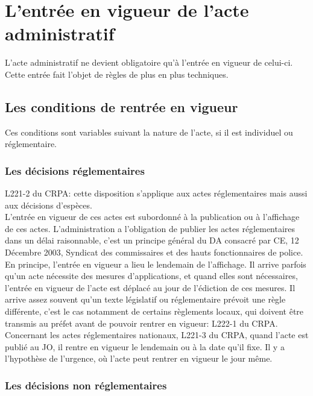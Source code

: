 \documentclass[10pt, a4paper, openany]{book}
\begin{document}
\section{L'entrée en vigueur de l'acte administratif}

L'acte administratif ne devient obligatoire qu'à l'entrée en vigueur de celui-ci. Cette entrée fait l'objet de règles de plus en plus techniques. 

\subsection{Les conditions de rentrée en vigueur}

Ces conditions sont variables suivant la nature de l'acte, si il est individuel ou réglementaire. 

\subsubsection{Les décisions réglementaires}

L221-2 du CRPA: cette disposition s'applique aux actes réglementaires mais aussi aux décisions d'espèces. \\
L'entrée en vigueur de ces actes est subordonné à la publication ou à l'affichage de ces actes. L'administration a l'obligation de publier les actes réglementaires dans un délai raisonnable, c'est un principe général du DA consacré par CE, 12 Décembre 2003, Syndicat des commissaires et des hauts fonctionnaires de police. \\
En principe, l'entrée en vigueur a lieu le lendemain de l'affichage. Il arrive parfois qu'un acte nécessite des mesures d'applications, et quand elles sont nécessaires, l'entrée en vigueur de l'acte est déplacé au jour de l'édiction de ces mesures. Il arrive assez souvent qu'un texte législatif ou réglementaire prévoit une règle différente, c'est le cas notamment de certains règlements locaux, qui doivent être transmis au préfet avant de pouvoir rentrer en vigueur: L222-1 du CRPA. \\
Concernant les actes réglementaires nationaux, L221-3 du CRPA, quand l'acte est publié au JO, il rentre en vigueur le lendemain ou à la date qu'il fixe. Il y a l'hypothèse de l'urgence, où l'acte peut rentrer en vigueur le jour même. 


\subsubsection{Les décisions non réglementaires}
\end{document}

